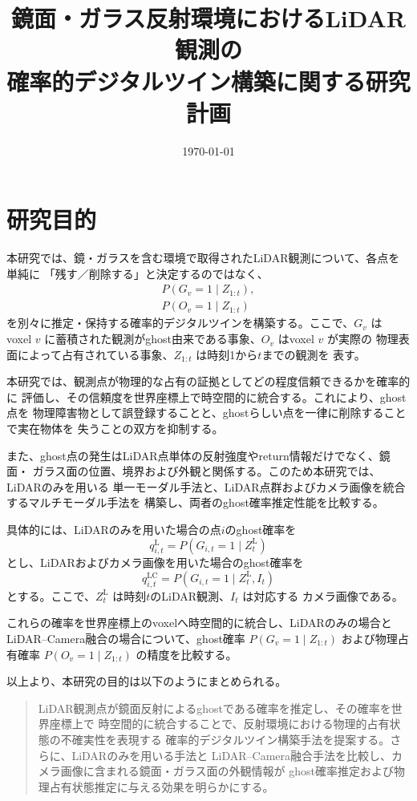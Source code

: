 \documentclass[uplatex,a4paper,11pt]{jsarticle}
\title{鏡面・ガラス反射環境におけるLiDAR観測の\\
確率的デジタルツイン構築に関する研究計画}
\author{}
\date{\today}
\begin{document}
\maketitle

\section{研究目的}

本研究では、鏡・ガラスを含む環境で取得されたLiDAR観測について、各点を単純に
「残す／削除する」と決定するのではなく、
\begin{align}
  P(G_v=1\mid Z_{1:t}), \\
  P(O_v=1\mid Z_{1:t})
\end{align}
を別々に推定・保持する確率的デジタルツインを構築する。ここで、$G_v$ は
voxel $v$ に蓄積された観測がghost由来である事象、$O_v$ はvoxel $v$ が実際の
物理表面によって占有されている事象、$Z_{1:t}$ は時刻1から$t$までの観測を
表す。

本研究では、観測点が物理的な占有の証拠としてどの程度信頼できるかを確率的に
評価し、その信頼度を世界座標上で時空間的に統合する。これにより、ghost点を
物理障害物として誤登録することと、ghostらしい点を一律に削除することで実在物体を
失うことの双方を抑制する。

また、ghost点の発生はLiDAR点単体の反射強度やreturn情報だけでなく、鏡面・
ガラス面の位置、境界および外観と関係する。このため本研究では、LiDARのみを用いる
単一モーダル手法と、LiDAR点群およびカメラ画像を統合するマルチモーダル手法を
構築し、両者のghost確率推定性能を比較する。

具体的には、LiDARのみを用いた場合の点$i$のghost確率を
\begin{equation}
  q_{i,t}^{\mathrm{L}}
  =
  P(G_{i,t}=1\mid Z_t^{\mathrm{L}})
\end{equation}
とし、LiDARおよびカメラ画像を用いた場合のghost確率を
\begin{equation}
  q_{i,t}^{\mathrm{LC}}
  =
  P(G_{i,t}=1\mid Z_t^{\mathrm{L}}, I_t)
\end{equation}
とする。ここで、$Z_t^{\mathrm{L}}$ は時刻$t$のLiDAR観測、$I_t$ は対応する
カメラ画像である。

これらの確率を世界座標上のvoxelへ時空間的に統合し、LiDARのみの場合と
LiDAR--Camera融合の場合について、ghost確率
$P(G_v=1\mid Z_{1:t})$ および物理占有確率
$P(O_v=1\mid Z_{1:t})$ の精度を比較する。

以上より、本研究の目的は以下のようにまとめられる。

\begin{quote}
LiDAR観測点が鏡面反射によるghostである確率を推定し、その確率を世界座標上で
時空間的に統合することで、反射環境における物理的占有状態の不確実性を表現する
確率的デジタルツイン構築手法を提案する。さらに、LiDARのみを用いる手法と
LiDAR--Camera融合手法を比較し、カメラ画像に含まれる鏡面・ガラス面の外観情報が
ghost確率推定および物理占有状態推定に与える効果を明らかにする。
\end{quote}
\end{document}
